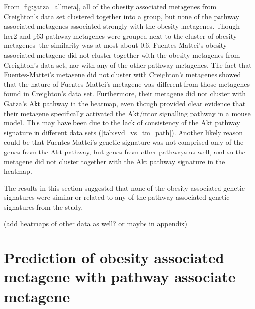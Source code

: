 From \cref{fig:gatza_allmeta}, all of the obesity associated metagenes from Creighton's data set clustered together into a group, but none of the pathway associated metagenes associated strongly with the obesity metagenes.
Though \gls{her2} and p63 pathway metagenes were grouped next to the cluster of obesity metagenes, the similarity was at most about 0.6.
Fuentes-Mattei's obesity associated metagene did not cluster together with the obesity metagenes from Creighton's data set, nor with any of the other pathway metagenes.
The fact that Fuentes-Mattei's metagene did not cluster with Creighton's metagenes showed that the nature of Fuentes-Mattei's metagene was different from those metagenes found in Creighton's data set.
Furthermore, their metagene did not cluster with Gatza's Akt pathway in the heatmap, even though \citet{Fuentes-Mattei2014} provided clear evidence that their metagene specifically activated the Akt/\gls{mtor} signalling pathway in a mouse model.
This may have been due to the lack of consistency of the Akt pathway signature in different data sets (\cref{tab:svd_vs_tm_path}).
Another likely reason could be that Fuentes-Mattei's genetic signature was not comprised only of the genes from the Akt pathway, but genes from other pathways as well, and so the metagene did not cluster together with the Akt pathway signature in the heatmap.

The results in this section suggested that none of the obesity associated genetic signatures were similar or related to any of the pathway associated genetic signatures from the \citet{Gatza2010a} study.

(add heatmaps of other data as well? or maybe in appendix)

\section{Prediction of obesity associated metagene with pathway associate metagene}
\label{sec:prediction_of_obesity_associated_metagene_with_pathway_associate_metagene}


